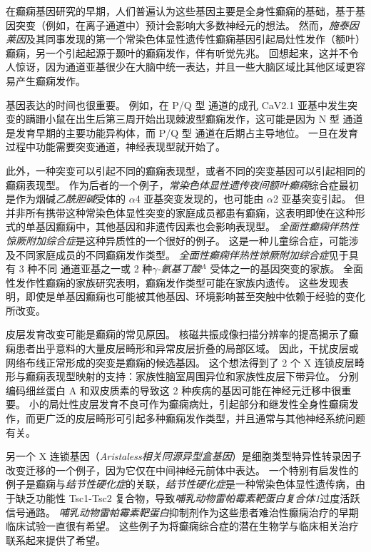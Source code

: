在癫痫基因研究的早期，人们普遍认为这些基因主要是全身性癫痫的基础，基于基因突变（例如，在离子通道中）预计会影响大多数神经元的想法。
然而，\textit{施泰因莱因}及其同事发现的第一个常染色体显性遗传性癫痫基因引起局灶性发作（额叶）癫痫，另一个引起起源于颞叶的癫痫发作，伴有听觉先兆。
回想起来，这并不令人惊讶，因为通道亚基很少在大脑中统一表达，并且一些大脑区域比其他区域更容易产生癫痫发作。


基因表达的时间也很重要。
例如，在 P/Q 型  通道的成孔 CaV2.1 亚基中发生突变的蹒跚小鼠在出生后第三周开始出现棘波型癫痫发作，这可能是因为 N 型  通道是发育早期的主要功能异构体，而 P/Q 型  通道在后期占主导地位。
一旦在发育过程中功能需要突变通道，神经表现型就开始了。


此外，一种突变可以引起不同的癫痫表现型，或者不同的突变基因可以引起相同的癫痫表现型。
作为后者的一个例子，\textit{常染色体显性遗传夜间额叶癫痫}综合症最初是作为烟碱\textit{乙酰胆碱}受体的 $\alpha$4 亚基突变发现的，也可能由 $\alpha$2 亚基突变引起。
但并非所有携带这种常染色体显性突变的家庭成员都患有癫痫，这表明即使在这种形式的单基因癫痫中，其他基因和非遗传因素也会影响表现型。
\textit{全面性癫痫伴热性惊厥附加综合症}是这种异质性的一个很好的例子。 这是一种儿童综合症，可能涉及不同家庭成员的不同癫痫发作类型。
\textit{全面性癫痫伴热性惊厥附加综合症}见于具有 3 种不同  通道亚基之一或 2 种\textit{$\gamma$-氨基丁酸}$^A$ 受体之一的基因突变的家族。
全面性发作性癫痫的家族研究表明，癫痫发作类型可能在家族内遗传。
这些发现表明，即使是单基因癫痫也可能被其他基因、环境影响甚至突触中依赖于经验的变化所改变。


皮层发育改变可能是癫痫的常见原因。
核磁共振成像扫描分辨率的提高揭示了癫痫患者出乎意料的大量皮层畸形和异常皮层折叠的局部区域。
因此，干扰皮层或网络布线正常形成的突变是癫痫的候选基因。
这个想法得到了 2 个 X 连锁皮层畸形与癫痫表现型映射的支持：家族性脑室周围异位和家族性皮层下带异位。
分别编码细丝蛋白 A 和双皮质素的导致这 2 种疾病的基因可能在神经元迁移中很重要。
小的局灶性皮层发育不良可作为癫痫病灶，引起部分和继发性全身性癫痫发作，而更广泛的皮层畸形可引起多种癫痫发作类型，并且通常与其他神经系统问题有关。


另一个 X 连锁基因（\textit{Aristaless相关同源异型盒基因}）是细胞类型特异性转录因子改变迁移的一个例子，因为它仅在中间神经元前体中表达。
一个特别有启发性的例子是癫痫与\textit{结节性硬化症}的关联，\textit{结节性硬化症}是一种常染色体显性遗传病，由于缺乏功能性 Tsc1-Tsc2 复合物，导致\textit{哺乳动物雷帕霉素靶蛋白复合体1}过度活跃信号通路。
\textit{哺乳动物雷帕霉素靶蛋白}抑制剂作为这些患者难治性癫痫治疗的早期临床试验一直很有希望。
这些例子为将癫痫综合症的潜在生物学与临床相关治疗联系起来提供了希望。


